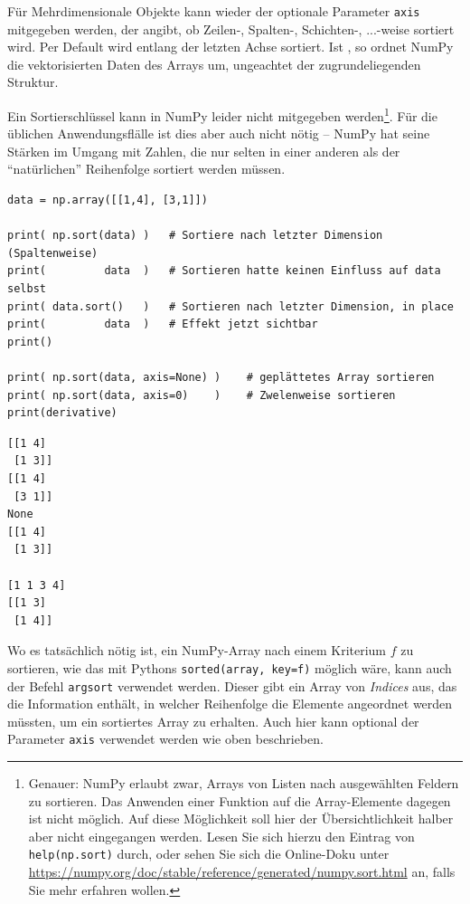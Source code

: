 Für Mehrdimensionale Objekte kann wieder der optionale Parameter \texttt{axis} mitgegeben werden, der angibt, ob Zeilen-, Spalten-, Schichten-, ...-weise sortiert wird. Per Default wird entlang der letzten Achse sortiert. Ist , so ordnet NumPy die vektorisierten Daten des Arrays um, ungeachtet der zugrundeliegenden Struktur.

Ein Sortierschlüssel kann in NumPy leider nicht mitgegeben werden\footnote{Genauer: NumPy erlaubt zwar, Arrays von Listen nach ausgewählten Feldern zu sortieren. Das Anwenden einer Funktion auf die Array-Elemente dagegen ist nicht möglich. Auf diese Möglichkeit soll hier der Übersichtlichkeit halber aber nicht eingegangen werden. Lesen Sie sich hierzu den Eintrag von \texttt{help(np.sort)} durch, oder sehen Sie sich die Online-Doku unter \url{https://numpy.org/doc/stable/reference/generated/numpy.sort.html} an, falls Sie mehr erfahren wollen.}. Für die üblichen Anwendungsflälle ist dies aber auch nicht nötig -- NumPy hat seine Stärken im Umgang mit Zahlen, die nur selten in einer anderen als der \enquote{natürlichen} Reihenfolge sortiert werden müssen.

\begin{codebox}
\begin{verbatim}
data = np.array([[1,4], [3,1]])

print( np.sort(data) )   # Sortiere nach letzter Dimension (Spaltenweise)
print(         data  )   # Sortieren hatte keinen Einfluss auf data selbst
print( data.sort()   )   # Sortieren nach letzter Dimension, in place
print(         data  )   # Effekt jetzt sichtbar
print()

print( np.sort(data, axis=None) )    # geplättetes Array sortieren
print( np.sort(data, axis=0)    )    # Zwelenweise sortieren
print(derivative)
\end{verbatim}
\end{codebox}
%
\begin{cmdbox}
\begin{verbatim}
[[1 4]
 [1 3]]
[[1 4]
 [3 1]]
None
[[1 4]
 [1 3]]

[1 1 3 4]
[[1 3]
 [1 4]]
\end{verbatim}
\end{cmdbox}

Wo es tatsächlich nötig ist, ein NumPy-Array nach einem Kriterium $f$ zu sortieren, wie das mit Pythons \texttt{sorted(array, key=f)} möglich wäre, kann auch der Befehl \texttt{argsort} verwendet werden. Dieser gibt ein Array von \emph{Indices} aus, das die Information enthält, in welcher Reihenfolge die Elemente angeordnet werden müssten, um ein sortiertes Array zu erhalten. Auch hier kann optional der Parameter \texttt{axis} verwendet werden wie oben beschrieben.

